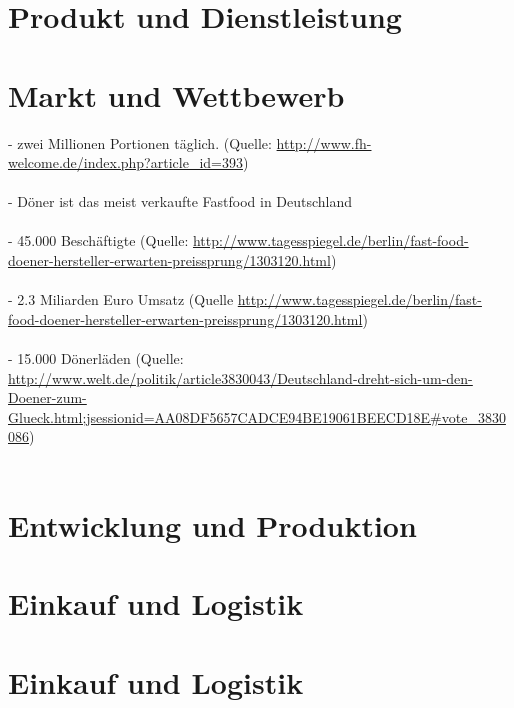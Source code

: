 \documentclass[12pt,a4paper]{scrartcl}
\begin{document}
\section{Produkt und Dienstleistung}

\section{Markt und Wettbewerb}
- zwei Millionen Portionen täglich. (Quelle: \url{http://www.fh-welcome.de/index.php?article_id=393})\\\\
- Döner ist das meist verkaufte Fastfood in Deutschland\\\\
- 45.000 Beschäftigte (Quelle: \url{http://www.tagesspiegel.de/berlin/fast-food-doener-hersteller-erwarten-preissprung/1303120.html})\\\\
- 2.3 Miliarden Euro Umsatz (Quelle \url{http://www.tagesspiegel.de/berlin/fast-food-doener-hersteller-erwarten-preissprung/1303120.html})\\\\
- 15.000 Dönerläden (Quelle: \url{http://www.welt.de/politik/article3830043/Deutschland-dreht-sich-um-den-Doener-zum-Glueck.html;jsessionid=AA08DF5657CADCE94BE19061BEECD18E#vote_3830086})\\\\
\section{Entwicklung und Produktion}

\section{Einkauf und Logistik}

\section{Einkauf und Logistik}

%
\end{document}
